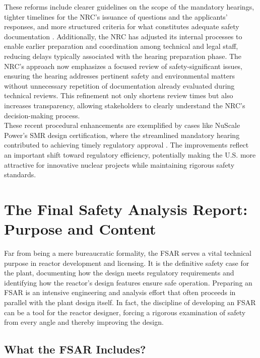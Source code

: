 \documentclass[5p,authoryear]{elsarticle}
\begin{document}
These reforms include clearer guidelines on the scope of the mandatory hearings, tighter timelines for the NRC's issuance of questions and the applicants' responses, and more structured criteria for what constitutes adequate safety documentation \cite{hogan2023nrc}. Additionally, the NRC has adjusted its internal processes to enable earlier preparation and coordination among technical and legal staff, reducing delays typically associated with the hearing preparation phase. The NRC's approach now emphasizes a focused review of safety-significant issues, ensuring the hearing addresses pertinent safety and environmental matters without unnecessary repetition of documentation already evaluated during technical reviews. This refinement not only shortens review times but also increases transparency, allowing stakeholders to clearly understand the NRC’s decision-making process.\\

These recent procedural enhancements are exemplified by cases like NuScale Power's SMR design certification, where the streamlined mandatory hearing contributed to achieving timely regulatory approval \cite{hogan2023nrc}. The improvements reflect an important shift toward regulatory efficiency, potentially making the U.S. more attractive for innovative nuclear projects while maintaining rigorous safety standards.\\

\section{The Final Safety Analysis Report: Purpose and Content}

Far from being a mere bureaucratic formality, the FSAR serves a vital technical purpose in reactor development and licensing. It is the definitive safety case for the plant, documenting how the design meets regulatory requirements and identifying how the reactor's design features ensure safe operation. Preparing an FSAR is an intensive engineering and analysis effort that often proceeds in parallel with the plant design itself. In fact, the discipline of developing an FSAR can be a tool for the reactor designer, forcing a rigorous examination of safety from every angle and thereby improving the design.

\subsection{What the FSAR Includes?} \label{What the FSAR Includes}
\vspace{0.2cm}
\end{document}
